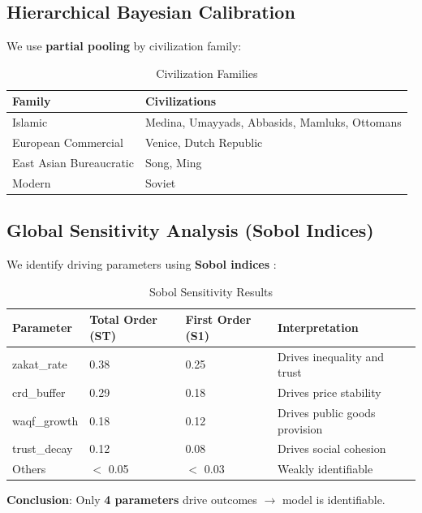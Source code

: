 \documentclass[12pt,a4paper]{article}
\begin{document}
\subsection{Hierarchical Bayesian Calibration}

We use \textbf{partial pooling} by civilization family:

\begin{table}[H]
\centering
\caption{Civilization Families}
\label{tab:families}
\begin{tabular}{p{4cm} p{8cm}}
\toprule
\textbf{Family} & \textbf{Civilizations} \\
\midrule
Islamic & Medina, Umayyads, Abbasids, Mamluks, Ottomans \\
European Commercial & Venice, Dutch Republic \\
East Asian Bureaucratic & Song, Ming \\
Modern & Soviet \\
\bottomrule
\end{tabular}
\end{table}

\subsection{Global Sensitivity Analysis (Sobol Indices)}

We identify driving parameters using \textbf{Sobol indices} \citep{saltelli2008global}:

\begin{table}[H]
\centering
\caption{Sobol Sensitivity Results}
\label{tab:sobol}
\begin{tabular}{p{4cm} p{3cm} p{3cm} p{4cm}}
\toprule
\textbf{Parameter} & \textbf{Total Order (ST)} & \textbf{First Order (S1)} & \textbf{Interpretation} \\
\midrule
zakat\_rate & 0.38 & 0.25 & Drives inequality and trust \\
crd\_buffer & 0.29 & 0.18 & Drives price stability \\
waqf\_growth & 0.18 & 0.12 & Drives public goods provision \\
trust\_decay & 0.12 & 0.08 & Drives social cohesion \\
Others & $<$ 0.05 & $<$ 0.03 & Weakly identifiable \\
\bottomrule
\end{tabular}
\end{table}

\textbf{Conclusion}: Only \textbf{4 parameters} drive outcomes $\rightarrow$ model is identifiable.
\end{document}
